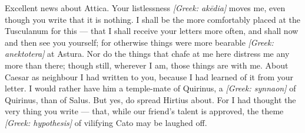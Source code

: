 

 Excellent news about Attica. Your listlessness \textit{[Greek: ak\=edia]} moves me, even though you write that it is nothing. I shall be the more comfortably placed at the Tusculanum for this --- that I shall receive your letters more often, and shall now and then see you yourself; for otherwise things were more bearable \textit{[Greek: anektotera]} at Astura. Nor do the things that chafe at me here distress me any more than there; though still, wherever I am, those things are with me. About Caesar as neighbour I had written to you, because I had learned of it from your letter. I would rather have him a temple-mate of Quirinus, a \textit{[Greek: synnaon]} of Quirinus, than of Salus. But yes, do spread Hirtius about. For I had thought the very thing you write --- that, while our friend's talent is approved, the theme \textit{[Greek: hypothesis]} of vilifying Cato may be laughed off.
